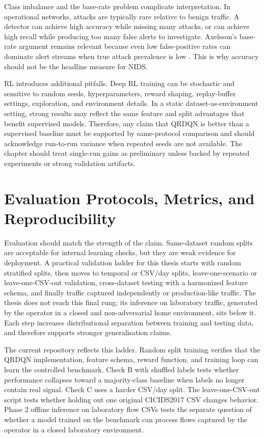 Class imbalance and the base-rate problem complicate interpretation. In operational networks, attacks are typically rare relative to benign traffic. A detector can achieve high accuracy while missing many attacks, or can achieve high recall while producing too many false alerts to investigate. Axelsson's base-rate argument remains relevant because even low false-positive rates can dominate alert streams when true attack prevalence is low \parencite{Axelsson1999BaseRate}. This is why accuracy should not be the headline measure for NIDS.

RL introduces additional pitfalls. Deep RL training can be stochastic and sensitive to random seeds, hyperparameters, reward shaping, replay-buffer settings, exploration, and environment details. In a static dataset-as-environment setting, strong results may reflect the same feature and split advantages that benefit supervised models. Therefore, any claim that QRDQN is better than a supervised baseline must be supported by same-protocol comparison and should acknowledge run-to-run variance when repeated seeds are not available. The chapter should treat single-run gains as preliminary unless backed by repeated experiments or strong validation artifacts.

\section{Evaluation Protocols, Metrics, and Reproducibility}

Evaluation should match the strength of the claim. Same-dataset random splits are acceptable for internal learning checks, but they are weak evidence for deployment. A practical validation ladder for this thesis starts with random stratified splits, then moves to temporal or CSV/day splits, leave-one-scenario or leave-one-CSV-out validation, cross-dataset testing with a harmonized feature schema, and finally traffic captured independently or production-like traffic. The thesis does not reach this final rung; its inference on laboratory traffic, generated by the operator in a closed and non-adversarial home environment, sits below it. Each step increases distributional separation between training and testing data, and therefore supports stronger generalisation claims.

The current repository reflects this ladder. Random split training verifies that the QRDQN implementation, feature schema, reward function, and training loop can learn the controlled benchmark. Check B with shuffled labels tests whether performance collapses toward a majority-class baseline when labels no longer contain real signal. Check C uses a harder CSV/day split. The leave-one-CSV-out script tests whether holding out one original CICIDS2017 CSV changes behavior. Phase 2 offline inference on laboratory flow CSVs tests the separate question of whether a model trained on the benchmark can process flows captured by the operator in a closed laboratory environment.

